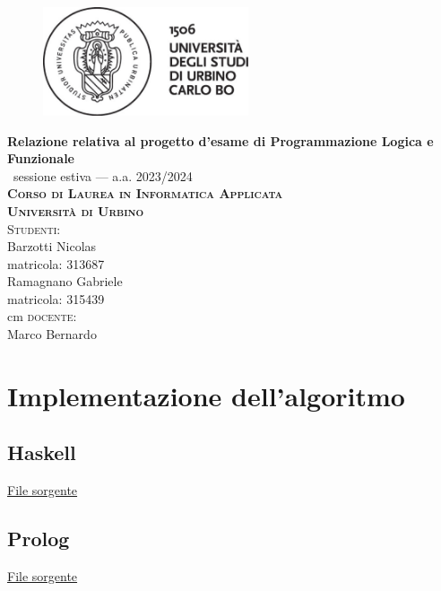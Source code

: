 \documentclass{article}
\begin{document}

\begin{titlepage}
	\centering
	\begin{figure}
	\vspace{2.5cm}
    \centerline{\includegraphics[height=3.2cm]{Resources/logo-uniurb-2016.jpg.eps}}
    \end{figure}
	\vspace*{\baselineskip}
	\LARGE{\bfseries Relazione relativa al progetto d'esame di Programmazione Logica e Funzionale }\\
	\Large{\ sessione estiva --- a.a. 2023/2024}\\ [0.6cm]
	\large{\textbf{\scshape{Corso di Laurea in Informatica Applicata\\ Università di Urbino}}}\\[3cm]
		{\large {\scshape Studenti:}\\[0.3cm] Barzotti Nicolas\\matricola: 313687\\
        Ramagnano Gabriele\\matricola: 315439}\\
         cm
	     \large{{\scshape docente:} \\[0.3cm] Marco Bernardo}\\[1.3cm]
	
\end{titlepage}

\index 
\tableofcontents

   
 

%
\section{Implementazione dell'algoritmo}

\subsection{Haskell}
\underline{File sorgente} %

\newpage
\subsection{Prolog}
\underline{File sorgente} %



\end{document}
